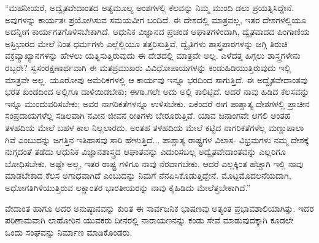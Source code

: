 “ಮಹನೀಯರೆ, ಅದ್ವೈತವೇದಾಂತದ ಅತ್ಯಮೂಲ್ಯ ಅಂಶಗಳಲ್ಲಿ ಕೆಲವನ್ನು ನಿಮ್ಮ ಮುಂದಿ ಡಲು ಪ್ರಯತ್ನಿಸಿದ್ದೇನೆ. ಅವುಗಳನ್ನು ಕಾರ್ಯತಃ ಪ್ರಯೋಗಿಸುವ ಸಮಯವೀಗ ಬಂದಿದೆ. ಈ ದೇಶದಲ್ಲಿ ಮಾತ್ರವಲ್ಲ, ಇತರ ದೇಶಗಳಲ್ಲಿಯೂ ಅದನ್ನೀಗ ಕಾರ್ಯಗತಗೊಳಿಸಬೇಕಾಗಿದೆ. ಆಧುನಿಕ ವಿಜ್ಞಾನದ ಪ್ರಚಂಡ ಆಘಾತಗಳಿಂದಾಗಿ, ದ್ವೈತವಾದದ ಪಿಂಗಾಣಿಯ ಅಸ್ತಿಭಾರದ ಮೇಲೆ ನಿಂತ ಧರ್ಮಗಳು ಎಲ್ಲೆಲ್ಲಿಯೂ ತತ್ತರಿಸುತ್ತಿವೆ. ದ್ವೈತಿಗಳು ಶಾಸ್ತ್ರಪಾಠಗಳನ್ನು ಜಗ್ಗಿ ತಿರುಚಿ ವಕ್ರವ್ಯಾಖ್ಯಾನಗಳನ್ನು ಹೇಳಲು ಯತ್ನಿಸುತ್ತಿರುವುದು ಈ ದೇಶದಲ್ಲಿ ಮಾತ್ರವೇ ಅಲ್ಲ. ಎಳೆದತ್ತ ಹಿಗ್ಗಲು ಶಾಸ್ತ್ರಗಳೇನು ರಬ್ಬರೇ? ಸ್ವಸಂರಕ್ಷಣಾರ್ಥವಾಗಿ ಈ ಮತಪ್ರಮುಖರು ವಿವಿಧೋಪಾಯಗಳನ್ನು ಕಂಡುಹಿಡಿಯುತ್ತಿರುವುದು ಇಲ್ಲಿ ಮಾತ್ರವೇ ಅಲ್ಲ. ಯೂರೋಪು ಅಮೆರಿಕಗಳಲ್ಲಿ ಆ ಕಾರ್ಯವು ಇನ್ನೂ ಭರದಿಂದ ಸಾಗುತ್ತಿದೆ. ಈ ಅದ್ವೈತವೇದಾಂತವು ಭರತ ಖಂಡದಿಂದ ಅಲ್ಲಿಗೂ ದಾಳಿಯಿಡಬೇಕು; ಈಗಾ.ಗಲೇ ಅದು ಅಲ್ಲಿ ಕಾಲಿಟ್ಟಿದೆ. ಆದರೆ ನಾವು ಹಿಡಿದ ಕೆಲಸವನ್ನು ಇನ್ನೂ ಮುಂದುವರಿಸಬೇಕು; ಅವರ ನಾಗರಿಕತೆಗಳನ್ನೂ ಉಳಿಸಬೇಕು. ಏಕೆಂದರೆ ಈಗ ಪಾಶ್ಚಾತ್ಯ ದೇಶಗಳಲ್ಲಿ ಪ್ರಾಚೀನ ಸಂಪ್ರದಾಯಗಳೆಲ್ಲ ಸಡಿಲವಾಗಿ ನವೀನ ಜೀವನ ರೀತಿಗಳು ಬೇರೂರುತ್ತಿವೆ. ಯಾವ ಜನಾಂಗವೇ ಆಗಲಿ ಅಂತಹ ತಳಹದಿಯ ಮೇಲೆ ಬಹಳ ಕಾಲ ನಿಲ್ಲಲಾರದು. ಅಂತಹ ತಳಹದಿಯ ಮೇಲೆ ಕಟ್ಟಿದ ನಾಗರಿಕತೆಗಳೆಲ್ಲ ಮಣ್ಣುಪಾಲಾ ಗಿವೆ ಎಂಬುದನ್ನು ಜಗತ್ತಿನ ಇತಿಹಾಸವು ಸಾರಿ ಹೇಳುತ್ತಿದೆ... ಪಾಶ್ಚಾತ್ಯ ರಾಷ್ಟ್ರಗಳ ವಿಲಾಸ- ವಿಭ್ರಮಗಳು ನಮ್ಮ ದೇಶಕ್ಕೆ ನುಗ್ಗದಂತೆ ತಡೆದು ಆಧುನಿಕ ವಿಜ್ಞಾನಶಾಸ್ತ್ರದ ಆಘಾತವನ್ನು ಎದುರಿಸಬಲ್ಲ ಅದ್ವೈತವೇದಾಂತವನ್ನು ಎಲ್ಲರಿಗೂ ಬೋಧಿಸಬೇಕು. ಅಷ್ಟೇ ಅಲ್ಲ, ಇತರ ರಾಷ್ಟ್ರ ಗಳಿಗೂ ನಾವು ನೆರವಾಗಬೇಕು. ಆದರೆ ಎಲ್ಲಕ್ಕಿಂತ ಹೆಚ್ಚಾಗಿ ಇಲ್ಲಿ ನಾವು ಮಾಡಬೇಕಾದ ಕೆಲಸ ಅಗಾಧವಾಗಿದೆ ಎಂಬುದನ್ನು ನಿಮಗೆ ನೆನಪಿಸಿಕೊಡುತ್ತಿದ್ದೇನೆ. ಮೊಟ್ಟಮೊದಲನೆಯದಾಗಿ, ಅಧೋಗತಿಗಿಳಿಯುತ್ತಿರುವ ಲಕ್ಷಾಂತರ ಭಾರತೀಯರನ್ನು ನಾವು ಕೈಹಿಡಿದು ಮೇಲೆತ್ತಬೇಕಾಗಿದೆ.”

ವೇದಾಂತ ಹಾಗೂ ಅದರ ಅನುಷ್ಠಾನವನ್ನು ಕುರಿತ ಈ ಸಾರ್ವಜನಿಕ ಭಾಷಣವು ಅತ್ಯಂತ ಪ್ರಭಾವಶಾಲಿಯಾಗಿತ್ತು. ಇದರ ಪರಿಣಾಮವಾಗಿ ಲಾಹೋರಿನ ಯುವಕರು ದೀನರಲ್ಲಿ ನಾರಾಯಣನನ್ನು ಕಂಡು ಸೇವೆ ಮಾಡುವುದಕ್ಕಾಗಿ ಕೂಡಲೇ ಒಂದು ಸಂಘವನ್ನು ನಿರ್ಮಾಣ ಮಾಡಿಕೊಂಡರು.

